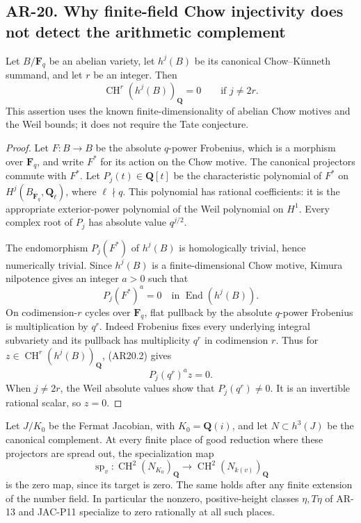 \subsection*{AR-20. Why finite-field Chow injectivity does not detect the arithmetic complement}

\begin{lemma}[AR-20a]\label{ar20a}
Let \(B/\mathbf F_q\) be an abelian variety, let \(h^j(B)\) be its
canonical Chow--K\"unneth summand, and let \(r\) be an integer.
Then
\[
     \operatorname{CH}^r(h^j(B))_{\mathbf Q}=0
                     \qquad\text{if }j\ne2r.                 \tag{AR20.1}
\]
This assertion uses the known finite-dimensionality of abelian
Chow motives and the Weil bounds; it does not require the Tate
conjecture.
\end{lemma}

\begin{proof}
Let \(F:B\to B\) be the absolute \(q\)-power Frobenius, which is a
morphism over \(\mathbf F_q\), and write \(F^*\) for its action on
the Chow motive. The canonical projectors commute with \(F^*\).
Let \(P_j(t)\in\mathbf Q[t]\) be the characteristic polynomial of
\(F^*\) on \(H^j(B_{\overline{\mathbf F}_q},\mathbf Q_\ell)\),
where \(\ell\nmid q\). This polynomial has rational coefficients:
it is the appropriate exterior-power polynomial of the Weil
polynomial on \(H^1\). Every complex root of \(P_j\) has absolute
value \(q^{j/2}\).

The endomorphism \(P_j(F^*)\) of \(h^j(B)\) is homologically
trivial, hence numerically trivial. Since \(h^j(B)\) is a
finite-dimensional Chow motive, Kimura nilpotence gives an integer
\(a>0\) such that
\[
                    P_j(F^*)^a=0
             \quad\text{in }\operatorname{End}(h^j(B)).
             \tag{AR20.2}
\]
On codimension-\(r\) cycles over \(\mathbf F_q\), flat pullback by
the absolute \(q\)-power Frobenius is multiplication by \(q^r\).
Indeed Frobenius fixes every underlying integral subvariety and
its pullback has multiplicity \(q^r\) in codimension \(r\).
Thus for \(z\in\operatorname{CH}^r(h^j(B))_{\mathbf Q}\),
(AR20.2) gives
\[
                        P_j(q^r)^a z=0.
\]
When \(j\ne2r\), the Weil absolute values show that
\(P_j(q^r)\ne0\). It is an invertible rational scalar, so \(z=0\).
\end{proof}

\begin{corollary}[AR-20b]\label{ar20b}
Let \(J/K_0\) be the Fermat Jacobian, with
\(K_0=\mathbf Q(i)\), and let \(N\subset h^3(J)\) be the
canonical complement. At every finite place of good reduction
where these projectors are spread out, the specialization map
\[
 \operatorname{sp}_v:
 \operatorname{CH}^2(N_{K_0})_{\mathbf Q}
       \longrightarrow
 \operatorname{CH}^2(N_{k(v)})_{\mathbf Q}
                                                               \tag{AR20.3}
\]
is the zero map, since its target is zero. The same holds after
any finite extension of the number field.
In particular the nonzero, positive-height classes
\(\eta,T\eta\) of AR-13 and JAC-P11 specialize to zero rationally
at all such places.
\end{corollary}


